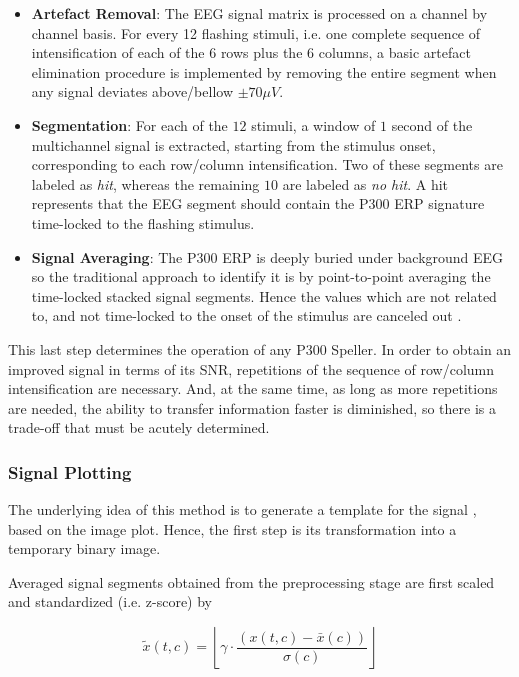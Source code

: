 \documentclass[entropy,article,submit,moreauthors,pdftex,10pt,a4paper]{mdpi}
\begin{document}
\begin{itemize}
\item \textbf{Artefact Removal}: The EEG signal matrix is processed on a channel by channel basis.   For every 12 flashing stimuli, i.e. one complete sequence of intensification of each of the $6$ rows plus the $6$ columns, a basic artefact elimination procedure is implemented by removing the entire segment when any signal deviates above/bellow $ \pm 70 \mu V $.
\item \textbf{Segmentation}: For each of the $12$ stimuli,  a window of $1$ second of the multichannel signal is extracted, starting from the stimulus onset, corresponding to each row/column intensification.  Two of these segments are labeled as \textit{hit}, whereas the remaining $10$ are labeled as \textit{no hit}.  A hit represents that the EEG segment should contain the P300 ERP signature time-locked to the flashing stimulus. 
\item \textbf{Signal Averaging}:  The P300 ERP is deeply buried under background EEG so the traditional approach to identify it is by point-to-point averaging the time-locked stacked signal segments.  Hence the values which are not related to, and not time-locked to the onset of the stimulus are canceled out \citep{Liang2008}. 
\end{itemize}

This last step determines the operation of any P300 Speller.  In order to obtain an improved signal in terms of its SNR, repetitions of the sequence of row/column intensification are necessary.  And, at the same time, as long as more repetitions are needed, the ability to transfer information faster is diminished, so there is a trade-off that must be acutely determined.

\subsubsection{Signal Plotting} \label{Plot}

The underlying idea of this method is to generate a template for the signal \citep{Ramele2016},  based on the image plot.  Hence, the first step is its transformation into a temporary binary image.

Averaged signal segments obtained from the preprocessing stage are first scaled and standardized (i.e. z-score) by 

\begin{equation}
\tilde{x}(t,c) = \left \lfloor{ \gamma \cdot \frac{( x(t,c) - \bar{x}(c)  )}{ \sigma(c) } }\right \rfloor
\end{equation}
\end{document}
